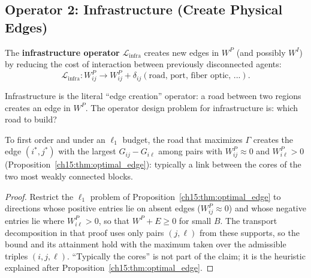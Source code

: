 \documentclass[../structural_economics_book.tex]{subfiles}
\begin{document}
\subsection{Operator 2: Infrastructure (Create Physical Edges)}

\begin{definition}\label{ch15:def:infra}
The \textbf{infrastructure operator} $\mathcal{L}_{\text{infra}}$ creates new edges in $W^P$ (and possibly $W^I$) by reducing the cost of interaction between previously disconnected agents:
\begin{equation}\label{ch15:eq:infra}
\mathcal{L}_{\text{infra}}: W^P_{ij} \to W^P_{ij} + \delta_{ij}(\text{road, port, fiber optic, ...}).
\end{equation}
\end{definition}

Infrastructure is the literal ``edge creation'' operator: a road between two regions creates an edge in $W^P$. The operator design problem for infrastructure is: which road to build?

\begin{corollary}\label{ch15:prop:road}
To first order and under an $\ell_1$ budget, the road that maximizes $\Gamma$ creates the edge $(i^*, j^*)$ with the largest $G_{ij} - G_{i\ell}$ among pairs with $W^P_{ij} \approx 0$ and $W^P_{i\ell} > 0$ (Proposition~\ref{ch15:thm:optimal_edge}): typically a link between the cores of the two most weakly connected blocks.
\end{corollary}

\begin{proof}
Restrict the $\ell_1$ problem of Proposition~\ref{ch15:thm:optimal_edge} to directions whose positive entries lie on absent edges ($W^P_{ij} \approx 0$) and whose negative entries lie where $W^P_{i\ell} > 0$, so that $W^P + E \geq 0$ for small $B$. The transport decomposition in that proof uses only pairs $(j, \ell)$ from these supports, so the bound and its attainment hold with the maximum taken over the admissible triples $(i, j, \ell)$. ``Typically the cores'' is not part of the claim; it is the heuristic explained after Proposition~\ref{ch15:thm:optimal_edge}.
\end{proof}
\end{document}
